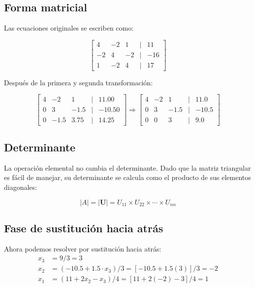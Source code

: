 \documentclass[12pt,letterpaper]{article}
\theoremstyle{definition}
\theoremstyle{plain}
\theoremstyle{remark}
\begin{document}
\subsection*{Forma matricial}

Las ecuaciones originales se escriben como:

\[
\begin{bmatrix}
4 & -2 & 1 & | & 11 \\
-2 & 4 & -2 & | & -16 \\
1 & -2 & 4 & | & 17
\end{bmatrix}
\]

Después de la primera y segunda transformación:

\[
\begin{bmatrix}
4 & -2 & 1 & | & 11.00 \\
0 & 3 & -1.5 & | & -10.50 \\
0 & -1.5 & 3.75 & | & 14.25
\end{bmatrix}
\Rightarrow
\begin{bmatrix}
4 & -2 & 1 & | & 11.0 \\
0 & 3 & -1.5 & | & -10.5 \\
0 & 0 & 3 & | & 9.0
\end{bmatrix}
\]

\subsection*{Determinante}

La operación elemental no cambia el determinante. Dado que la matriz triangular es fácil de manejar, su determinante se calcula como el producto de sus elementos diagonales:

\begin{equation}
    |A| = |\mathbf{U}| = U_{11} \times U_{22} \times \cdots \times U_{nn} \label{eq:1.4} \tag{1.4}
\end{equation}


\subsection*{Fase de sustitución hacia atrás}

Ahora podemos resolver por sustitución hacia atrás:
\begin{align*}
x_3 &= 9/3 = 3 \\
x_2 &= (-10.5 + 1.5 \cdot x_3)/3 = [-10.5 + 1.5(3)]/3 = -2 \\
x_1 &= (11 + 2x_2 - x_3)/4 = [11 + 2(-2) - 3]/4 = 1
\end{align*}
\end{document}
